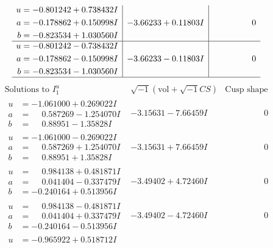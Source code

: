 \documentclass[1p]{elsarticle_modified}
\theoremstyle{definition}
\newcommand{\I}{\sqrt{-1}}
\begin{document}
$$\begin{array}{c|c|c}
\begin{aligned}
u &= -0.801242 + 0.738432 I \\
a &= -0.178862 + 0.150998 I \\
b &= -0.823534 + 1.030560 I\end{aligned}
 & -3.66233 + 0.11803 I & \phantom{-0.000000 } 0 \\ \hline\begin{aligned}
u &= -0.801242 - 0.738432 I \\
a &= -0.178862 - 0.150998 I \\
b &= -0.823534 - 1.030560 I\end{aligned}
 & -3.66233 - 0.11803 I & \phantom{-0.000000 } 0\\
 \hline 
 \end{array}$$\newpage$$\begin{array}{c|c|c}  
\text{Solutions to }I^u_{1}& \I (\text{vol} + \sqrt{-1}CS) & \text{Cusp shape}\\
 \hline 
\begin{aligned}
u &= -1.061000 + 0.269022 I \\
a &= \phantom{-}0.587269 - 1.254070 I \\
b &= \phantom{-}0.88951 - 1.35828 I\end{aligned}
 & -3.15631 - 7.66459 I & \phantom{-0.000000 } 0 \\ \hline\begin{aligned}
u &= -1.061000 - 0.269022 I \\
a &= \phantom{-}0.587269 + 1.254070 I \\
b &= \phantom{-}0.88951 + 1.35828 I\end{aligned}
 & -3.15631 + 7.66459 I & \phantom{-0.000000 } 0 \\ \hline\begin{aligned}
u &= \phantom{-}0.984138 + 0.481871 I \\
a &= \phantom{-}0.041404 - 0.337479 I \\
b &= -0.240164 + 0.513956 I\end{aligned}
 & -3.49402 + 4.72460 I & \phantom{-0.000000 } 0 \\ \hline\begin{aligned}
u &= \phantom{-}0.984138 - 0.481871 I \\
a &= \phantom{-}0.041404 + 0.337479 I \\
b &= -0.240164 - 0.513956 I\end{aligned}
 & -3.49402 - 4.72460 I & \phantom{-0.000000 } 0 \\ \hline\begin{aligned}
u &= -0.965922 + 0.518712 I \\

\end{aligned}
\end{array}$$
\end{document}
